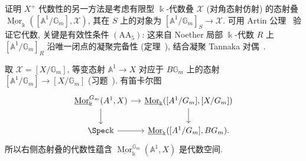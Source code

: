 \begin{remark}\label{src:7.8.13}
证明 $X^+$ 代数性的另一方法是考虑有限型 $\Bbbk$-代数叠 $\mathcal X$ (对角态射仿射) 的态射叠 $\underline{\operatorname{Mor}}_{\Bbbk}([\mathbb A^1/\mathbb G_m],\mathcal X)$, 其在 $S$ 上的对象为 $[\mathbb A^1/\mathbb G_m]_S\to\mathcal X$. 可用 Artin 公理~ 验证它代数, 关键是有效性条件 $(\mathrm{AA}_5)$: 这来自 Noether 局部 $\Bbbk$-代数 $R$ 上 $[\mathbb A^1/\mathbb G_m]_R$ 沿唯一闭点的凝聚完备性 (定理~), 结合凝聚 Tannaka 对偶~.

取 $\mathcal X=[X/\mathbb G_m]$, 等变态射 $\mathbb A^1\to X$ 对应于 $B\mathbb G_m$ 上的态射 $[\mathbb A^1/\mathbb G_m]\to[X/\mathbb G_m]$ (习题~). 有笛卡尔图
\begin{align*}
\begin{tikzcd}[ampersand replacement=\&,column sep=small]
\underline{\operatorname{Mor}}_{\Bbbk}^{\mathbb G_m}(\mathbb A^1,X)\arrow[r]\arrow[d]\&\underline{\operatorname{Mor}}_{\Bbbk}([\mathbb A^1/\mathbb G_m],[X/\mathbb G_m])\arrow[d]\\
\Spec\Bbbk\arrow[r]\&\underline{\operatorname{Mor}}_{\Bbbk}([\mathbb A^1/\mathbb G_m],B\mathbb G_m).
\end{tikzcd}
\end{align*}
所以右侧态射叠的代数性蕴含 $\underline{\operatorname{Mor}}_{\Bbbk}^{\mathbb G_m}(\mathbb A^1,X)$ 是代数空间.
\end{remark}


